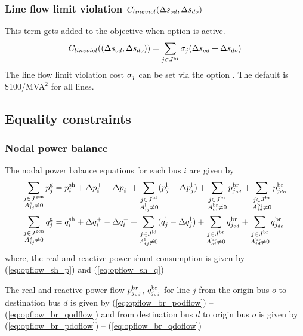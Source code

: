 \subsubsection{Line flow limit violation $C_{lineviol}(\Delta{s}_{od}, \Delta{s}_{do})$}
This term gets added to the objective when  \option{\opflowallowlineflowviolation} option is active. 
\begin{equation}
C_{lineviol}((\Delta{s}_{od}, \Delta{s}_{do})) =  \sum_{j \in J^\mathrm{br}}{\sigma_j(\Delta{s}_{od} + \Delta{s}_{do})}
\label{eq:opf_obj_minlineviol}
\end{equation}
The line flow limit violation cost $\sigma_j$ can be set via the option
\option{\opflowlineflowviolationpenalty}. The default is \$100/MVA$^2$ for all lines.

\subsection{Equality constraints}\label{sec:opflow_eq}

\subsubsection{Nodal power balance}
The nodal power balance equations for each bus $i$ are given by
\begin{align}
\sum_{\substack{j \in J^\mathrm{gen} \\ A^{\text{g}}_{ij} \neq 0}} p^\mathrm{g}_j &=   p^{\mathrm{sh}}_i + \Delta{p}^{+}_i - \Delta{p}^{-}_i + \sum_{\substack{j \in J^\mathrm{ld} \\ A^{\text{l}}_{ij} \neq 0}} (p^{\mathrm{l}}_j - \Delta{p}^{\mathrm{l}}_j) + \sum_{\substack{j \in J^\mathrm{br} \\ A^{\text{br}}_{oi} \neq 0}} p^\mathrm{br}_{j_{od}} + \sum_{\substack{j \in J^\mathrm{br} \\ A^{\text{br}}_{id} \neq 0}} p^\mathrm{br}_{j_{do}} \\
\sum_{\substack{j \in J^\mathrm{gen} \\ A^{\text{g}}_{ij} \neq 0}} q^\mathrm{g}_j &=  q^{\mathrm{sh}}_i + \Delta{q}^{+}_i - \Delta{q}^{-}_i + \sum_{\substack{j \in J^\mathrm{ld} \\ A^{\text{l}}_{ij} \neq 0}} (q^{\mathrm{l}}_j - \Delta{q}^{\mathrm{l}}_j) +
\sum_{\substack{j \in J^\mathrm{br} \\ A^{\text{br}}_{oi} \neq 0}} q^\mathrm{br}_{j_{od}} + \sum_{\substack{j \in J^\mathrm{br} \\ A^{\text{br}}_{id} \neq 0}} q^\mathrm{br}_{j_{do}} \\
\end{align}
where, the real and reactive power shunt consumption is given by (\ref{eq:opflow_sh_p}) and (\ref{eq:opflow_sh_q})


The real and reactive power flow $p^\mathrm{br}_{j_{od}}$, $q^\mathrm{br}_{j_{od}}$ for line $j$ from the origin bus $o$ to destination bus $d$ is given by (\ref{eq:opflow_br_podflow}) -- 
 (\ref{eq:opflow_br_qodflow})
and from destination bus $d$ to origin bus $o$ is given by (\ref{eq:opflow_br_pdoflow}) -- 
 (\ref{eq:opflow_br_qdoflow})

